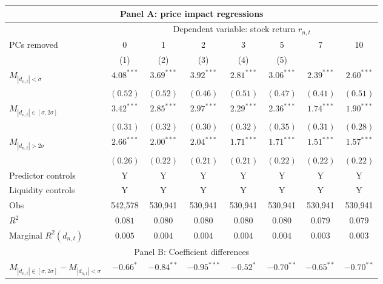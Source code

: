 \begin{tabular}{lccccccc}
  \hline \multicolumn{8}{c}{Panel A: price impact regressions} \\
 \hline
                                    & \multicolumn{7}{c}{Dependent variable: stock return $r_{n,t}$} \\

                                    \cmidrule(l){2-8} PCs removed & 0 & 1 & 2 & 3 & 5 & 7 & 10 \\
 \cmidrule(l){2-8} 
  & (1) & (2) & (3) & (4) & (5) &  &  \\ 
  $M_{|d_{n,t}| < \sigma}$ & $4.08^{***}$ & $3.69^{***}$ & $3.92^{***}$ & $2.81^{***}$ & $3.06^{***}$ & $2.39^{***}$ & $2.60^{***}$ \\ 
   & $(0.52)$ & $(0.52)$ & $(0.46)$ & $(0.51)$ & $(0.47)$ & $(0.41)$ & $(0.51)$ \\ 
  $M_{|d_{n,t}| \in [\sigma, 2\sigma]}$ & $3.42^{***}$ & $2.85^{***}$ & $2.97^{***}$ & $2.29^{***}$ & $2.36^{***}$ & $1.74^{***}$ & $1.90^{***}$ \\ 
   & $(0.31)$ & $(0.32)$ & $(0.30)$ & $(0.32)$ & $(0.35)$ & $(0.31)$ & $(0.28)$ \\ 
  $M_{|d_{n,t}| > 2 \sigma}$ & $2.66^{***}$ & $2.00^{***}$ & $2.04^{***}$ & $1.71^{***}$ & $1.71^{***}$ & $1.51^{***}$ & $1.57^{***}$ \\ 
   \vspace{5pt} & $(0.26)$ & $(0.22)$ & $(0.21)$ & $(0.21)$ & $(0.22)$ & $(0.22)$ & $(0.22)$ \\ 
  Predictor controls & Y & Y & Y & Y & Y & Y & Y \\ 
   \vspace{5pt}Liquidity controls & Y & Y & Y & Y & Y & Y & Y \\ 
  Obs & 542,578 & 530,941 & 530,941 & 530,941 & 530,941 & 530,941 & 530,941 \\ 
  $R^2$ & $0.081$ & $0.080$ & $0.080$ & $0.080$ & $0.080$ & $0.079$ & $0.079$ \\ 
  Marginal $R^2(d_{n,t})$ & $0.005$ & $0.004$ & $0.004$ & $0.004$ & $0.004$ & $0.003$ & $0.003$ \\ 
   \hline \multicolumn{8}{c}{Panel B: Coefficient differences} \\
 \hline$M_{|d_{n,t}| \in [\sigma, 2\sigma]} - M_{|d_{n,t}| < \sigma}$ & $-0.66^{*}$ & $-0.84^{**}$ & $-0.95^{***}$ & $-0.52^{*}$ & $-0.70^{**}$ & $-0.65^{**}$ & $-0.70^{**}$ \\ 

\end{tabular}
